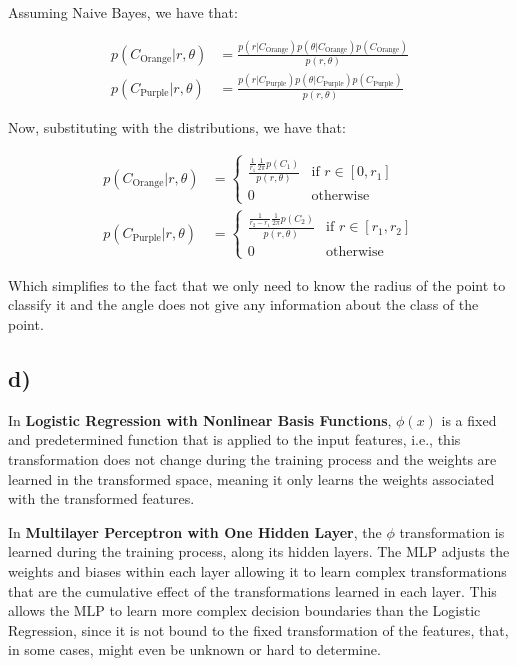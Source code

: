 \documentclass[12pt,a4paper,oneside]{paper}
\begin{document}
Assuming Naive Bayes, we have that: 

\begin{align*}
    p(C_{\text{Orange}} | r, \theta) &= \frac{p(r | C_{\text{Orange}}) p(\theta | C_{\text{Orange}}) p(C_{\text{Orange}})}{p(r, \theta)} \\
    p(C_{\text{Purple}} | r, \theta) &= \frac{p(r | C_{\text{Purple}}) p(\theta | C_{\text{Purple}}) p(C_{\text{Purple}})}{p(r, \theta)}
\end{align*}

Now, substituting with the distributions, we have that:

\begin{align*}
    p(C_{\text{Orange}} | r, \theta) &= \begin{cases}
        \frac{\frac{1}{r_1} \frac{1}{2\pi} p(C_1)}{p(r, \theta)} & \text{if } r \in [0, r_1] \\
        0 & \text{otherwise} 
    \end{cases} \\
    p(C_{\text{Purple}} | r, \theta) &= \begin{cases}
        \frac{\frac{1}{r_2 - r_1} \frac{1}{2\pi} p(C_2)}{p(r, \theta)} & \text{if } r \in [r_1, r_2] \\
        0 & \text{otherwise}
    \end{cases}
\end{align*}

Which simplifies to the fact that we only need to know the radius of the point to classify it
and the angle does not give any information about the class of the point.

\newpage
\subsection*{d)}

In \textbf{Logistic Regression with Nonlinear Basis Functions}, $\phi(x)$ is a fixed and predetermined function
that is applied to the input features, i.e., this transformation does not change during the training process
and the weights are learned in the transformed space, meaning it only learns the weights associated with the
transformed features.

In \textbf{Multilayer Perceptron with One Hidden Layer}, the $\phi$ transformation is learned during the training process,
along its hidden layers. The MLP adjusts the weights and biases within each layer allowing it to learn complex transformations that are
the cumulative effect of the transformations learned in each layer. This allows the MLP to learn more complex decision boundaries than the Logistic Regression,
since it is not bound to the fixed transformation of the features, that, in some cases, might even be unknown or hard to determine.
\end{document}
